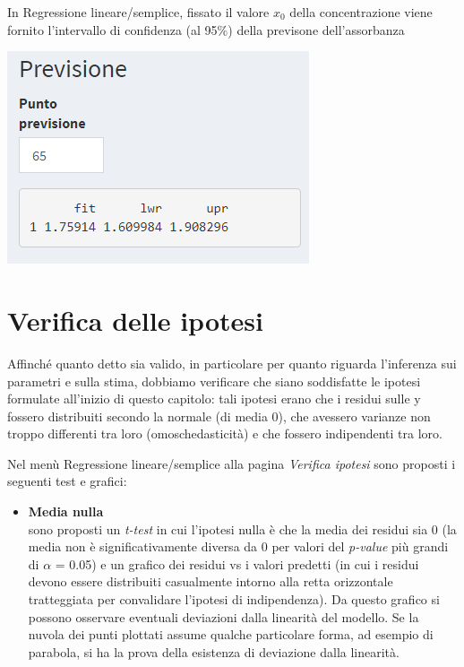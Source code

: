 \documentclass[
  11pt,
]{book}
\providecommand{\tightlist}{%
  \setlength{\itemsep}{0pt}\setlength{\parskip}{0pt}}
\begin{document}
In Regressione lineare/semplice, fissato il valore \(x_0\) della concentrazione viene fornito l'intervallo di confidenza (al 95\%) della previsone dell'assorbanza

\begin{center}\includegraphics[width=0.5\linewidth]{Immagini/Regressione/10_int_conf_prev_numerico} \end{center}

\hypertarget{verifica-delle-ipotesi-1}{%
\section{Verifica delle ipotesi}\label{verifica-delle-ipotesi-1}}

Affinché quanto detto sia valido, in particolare per quanto riguarda l'inferenza sui parametri e sulla stima, dobbiamo verificare che siano soddisfatte le ipotesi formulate all'inizio di questo capitolo: tali ipotesi erano che i residui sulle y fossero distribuiti secondo la normale (di media 0), che avessero varianze non troppo differenti tra loro (omoschedasticità) e che fossero indipendenti tra loro.

Nel menù Regressione lineare/semplice alla pagina \emph{Verifica ipotesi} sono proposti i seguenti test e grafici:

\begin{itemize}
\tightlist
\item
  \textbf{Media nulla}\\
  sono proposti un \emph{t-test} in cui l'ipotesi nulla è che la media dei residui sia 0 (la media non è significativamente diversa da 0 per valori del \emph{p-value} più grandi di \(\alpha\) = 0.05) e un grafico dei residui vs i valori predetti (in cui i residui devono essere distribuiti casualmente intorno alla retta orizzontale tratteggiata per convalidare l'ipotesi di indipendenza). Da questo grafico si possono osservare eventuali deviazioni dalla linearità del modello. Se la nuvola dei punti plottati assume qualche particolare forma, ad esempio di parabola, si ha la prova della esistenza di deviazione dalla linearità.
\end{itemize}
\end{document}
